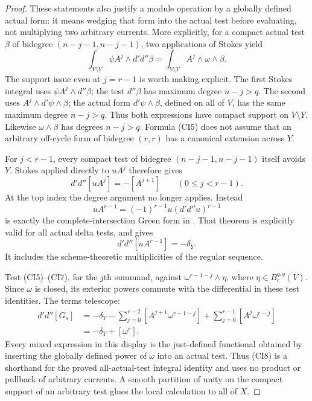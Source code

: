 \begin{proof}
These statements also justify a module operation by a globally defined
actual form: it means wedging that form into the actual test before
evaluating, not multiplying two arbitrary currents.  More explicitly,
for a compact actual test $\beta$ of bidegree
$(n-j-1,n-j-1)$, two applications of Stokes yield
\[
       \int_{V\setminus Y}\psi A^j\wedge d'd''\beta
          =\int_{V\setminus Y} A^j\wedge\omega\wedge\beta.
                                                        \tag{CI5}
\]
The support issue even at $j=r-1$ is worth making explicit.  The first
Stokes integral uses $\psi A^j\wedge d''\beta$; the test
$d''\beta$ has maximum degree $n-j>q$.  The second uses
$A^j\wedge d'\psi\wedge\beta$; the actual form
$d'\psi\wedge\beta$, defined on all of $V$, has the same maximum
degree $n-j>q$.  Thus both expressions have compact support on
$V\setminus Y$.  Likewise $\omega\wedge\beta$ has degrees
$n-j>q$.  Formula (CI5) does not assume that an arbitrary off-cycle
form of bidegree $(r,r)$ has a canonical extension across $Y$.

For $j<r-1$, every compact test of bidegree
$(n-j-1,n-j-1)$ itself avoids $Y$.  Stokes applied directly to
$uA^j$ therefore gives
\[
                    d'd''[uA^j]=-[A^{j+1}]
                                \qquad(0\le j<r-1).     \tag{CI6}
\]
At the top index the degree argument no longer applies.  Instead
\[
                  uA^{r-1}=(-1)^{r-1}u(d'd''u)^{r-1}
\]
is exactly the complete-intersection Green form in
\cite[Theorem 5.5]{Mih24}.  That theorem is explicitly valid for all
actual delta tests, and gives
\[
                       d'd''[uA^{r-1}]=-\delta_Y.        \tag{CI7}
\]
It includes the scheme-theoretic multiplicities of the regular sequence.

Test (CI5)--(CI7), for the $j$th summand, against
$\omega^{r-1-j}\wedge\eta$, where
$\eta\in B_c^{q,q}(V)$.  Since $\omega$ is closed, its exterior
powers commute with the differential in these test identities.
The terms telescope:
\[
 \begin{split}
 d'd''[G_s]
   &= -\delta_Y
      -\sum_{j=0}^{r-2}[A^{j+1}\omega^{r-1-j}]
      +\sum_{j=0}^{r-1}[A^j\omega^{r-j}]\\
   &= -\delta_Y+[\omega^r].
 \end{split}                                                   \tag{CI8}
\]
Every mixed expression in this display is the just-defined functional
obtained by inserting the globally defined power of $\omega$ into an
actual test.  Thus (CI8) is a shorthand for the proved all-actual-test
integral identity and uses no product or pullback of arbitrary currents.
A smooth partition of unity on the compact support of an arbitrary test
glues the local calculation to all of $X$.


\end{proof}
